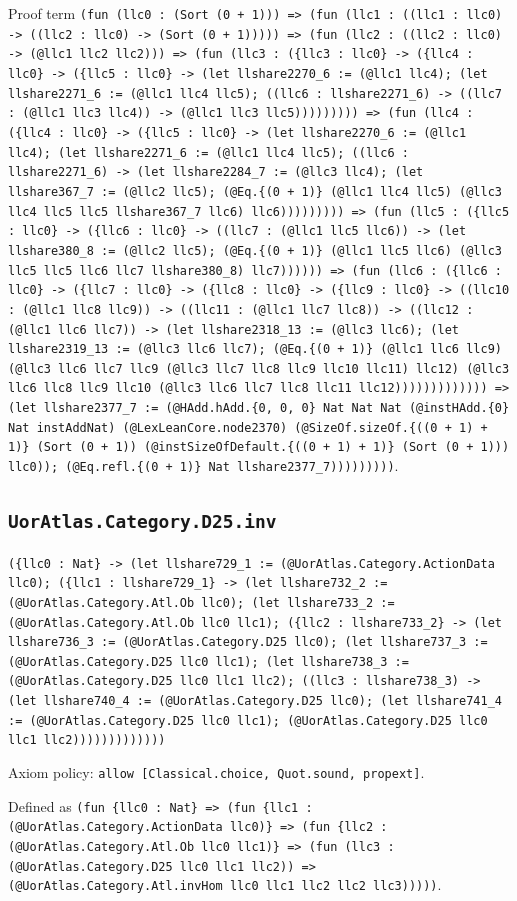\documentclass[11pt]{article}
\begin{document}
\noindent Proof term \texttt{(fun (llc0 : (Sort (0 + 1))) => (fun (llc1 : ((llc1 : llc0) -> ((llc2 : llc0) -> (Sort (0 + 1))))) => (fun (llc2 : ((llc2 : llc0) -> (@llc1 llc2 llc2))) => (fun (llc3 : (\{llc3 : llc0\} -> (\{llc4 : llc0\} -> (\{llc5 : llc0\} -> (let llshare2270\_6 := (@llc1 llc4); (let llshare2271\_6 := (@llc1 llc4 llc5); ((llc6 : llshare2271\_6) -> ((llc7 : (@llc1 llc3 llc4)) -> (@llc1 llc3 llc5))))))))) => (fun (llc4 : (\{llc4 : llc0\} -> (\{llc5 : llc0\} -> (let llshare2270\_6 := (@llc1 llc4); (let llshare2271\_6 := (@llc1 llc4 llc5); ((llc6 : llshare2271\_6) -> (let llshare2284\_7 := (@llc3 llc4); (let llshare367\_7 := (@llc2 llc5); (@Eq.\{(0 + 1)\} (@llc1 llc4 llc5) (@llc3 llc4 llc5 llc5 llshare367\_7 llc6) llc6))))))))) => (fun (llc5 : (\{llc5 : llc0\} -> (\{llc6 : llc0\} -> ((llc7 : (@llc1 llc5 llc6)) -> (let llshare380\_8 := (@llc2 llc5); (@Eq.\{(0 + 1)\} (@llc1 llc5 llc6) (@llc3 llc5 llc5 llc6 llc7 llshare380\_8) llc7)))))) => (fun (llc6 : (\{llc6 : llc0\} -> (\{llc7 : llc0\} -> (\{llc8 : llc0\} -> (\{llc9 : llc0\} -> ((llc10 : (@llc1 llc8 llc9)) -> ((llc11 : (@llc1 llc7 llc8)) -> ((llc12 : (@llc1 llc6 llc7)) -> (let llshare2318\_13 := (@llc3 llc6); (let llshare2319\_13 := (@llc3 llc6 llc7); (@Eq.\{(0 + 1)\} (@llc1 llc6 llc9) (@llc3 llc6 llc7 llc9 (@llc3 llc7 llc8 llc9 llc10 llc11) llc12) (@llc3 llc6 llc8 llc9 llc10 (@llc3 llc6 llc7 llc8 llc11 llc12))))))))))))) => (let llshare2377\_7 := (@HAdd.hAdd.\{0, 0, 0\} Nat Nat Nat (@instHAdd.\{0\} Nat instAddNat) (@LexLeanCore.node2370) (@SizeOf.sizeOf.\{((0 + 1) + 1)\} (Sort (0 + 1)) (@instSizeOfDefault.\{((0 + 1) + 1)\} (Sort (0 + 1))) llc0)); (@Eq.refl.\{(0 + 1)\} Nat llshare2377\_7)))))))))}.\par
\subsection*{\texttt{UorAtlas.Category.D25.inv}}
\noindent\texttt{(\{llc0 : Nat\} -> (let llshare729\_1 := (@UorAtlas.Category.ActionData llc0); (\{llc1 : llshare729\_1\} -> (let llshare732\_2 := (@UorAtlas.Category.Atl.Ob llc0); (let llshare733\_2 := (@UorAtlas.Category.Atl.Ob llc0 llc1); (\{llc2 : llshare733\_2\} -> (let llshare736\_3 := (@UorAtlas.Category.D25 llc0); (let llshare737\_3 := (@UorAtlas.Category.D25 llc0 llc1); (let llshare738\_3 := (@UorAtlas.Category.D25 llc0 llc1 llc2); ((llc3 : llshare738\_3) -> (let llshare740\_4 := (@UorAtlas.Category.D25 llc0); (let llshare741\_4 := (@UorAtlas.Category.D25 llc0 llc1); (@UorAtlas.Category.D25 llc0 llc1 llc2)))))))))))))}\par
\noindent Axiom policy: \texttt{allow [Classical.choice, Quot.sound, propext]}.\par
\noindent Defined as \texttt{(fun \{llc0 : Nat\} => (fun \{llc1 : (@UorAtlas.Category.ActionData llc0)\} => (fun \{llc2 : (@UorAtlas.Category.Atl.Ob llc0 llc1)\} => (fun (llc3 : (@UorAtlas.Category.D25 llc0 llc1 llc2)) => (@UorAtlas.Category.Atl.invHom llc0 llc1 llc2 llc2 llc3)))))}.\par
\end{document}
